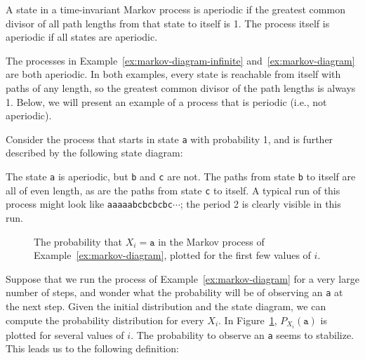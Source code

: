 \begin{definition}
A state in a time-invariant Markov process is aperiodic if the greatest common divisor of all path lengths from that state to itself is 1. The process itself is aperiodic if all states are aperiodic.
\end{definition}

The processes in Example~\ref{ex:markov-diagram-infinite} and~\ref{ex:markov-diagram} are both aperiodic. In both examples, every state is reachable from itself with paths of any length, so the greatest common divisor of the path lengths is always 1. Below, we will present an example of a process that is periodic (i.e., not aperiodic).

\begin{example}\label{ex:periodic-markov-process}
Consider the process that starts in state \texttt{a} with probability 1, and is further described by the following state diagram:
\begin{center}
\end{center}
The state \texttt{a} is aperiodic, but \texttt{b} and \texttt{c} are not. The paths from state \texttt{b} to itself are all of even length, as are the paths from state \texttt{c} to itself. A typical run of this process might look like \texttt{aaaaabcbcbcbc}$\cdots$; the period 2 is clearly visible in this run.
\end{example}

\begin{figure}[h]
	\centering
	\caption{The probability that $X_i = \texttt{a}$ in the Markov process of Example~\ref{ex:markov-diagram}, plotted for the first few values of $i$.}\label{fig:stationary-distribution}
\end{figure}
Suppose that we run the process of Example~\ref{ex:markov-diagram} for a very large number of steps, and wonder what the probability will be of observing an \texttt{a} at the next step. Given the initial distribution and the state diagram, we can compute the probability distribution for every $X_i$. In Figure~\ref{fig:stationary-distribution}, $P_{X_i}(\texttt{a})$ is plotted for several values of $i$. The probability to observe an \texttt{a} seems to stabilize. This leads us to the following definition:


